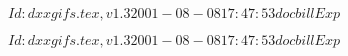 \documentclass{article}
\begin{document}
$Id: dxxgifs.tex,v 1.3 2001-08-08 17:47:53 docbill Exp $


\pagebreak


$Id: dxxgifs.tex,v 1.3 2001-08-08 17:47:53 docbill Exp $


\pagebreak
\end{document}
